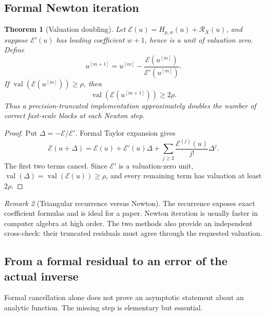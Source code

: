 \documentclass[11pt]{article}
\newtheorem{theorem}{Theorem}[section]
\theoremstyle{definition}
\theoremstyle{remark}
\newtheorem{remark}[theorem]{Remark}
\newcommand{\calE}{\mathcal E}
\DeclareMathOperator{\val}{val}
\begin{document}
\subsection{Formal Newton iteration}

\begin{theorem}[Valuation doubling]\label{thm:newton-doubling}
Let \(\calE(u)=H_{p,w}(u)+\mathscr R_X(u)\), and suppose
\(\calE'(u)\) has leading coefficient \(w+1\), hence is a unit of valuation zero.  Define
\begin{equation}\label{eq:newton-formal}
 u^{[m+1]}=u^{[m]}-\frac{\calE(u^{[m]})}{\calE'(u^{[m]})}.
\end{equation}
If \(\val(\calE(u^{[m]}))\ge\rho\), then
\[
 \val(\calE(u^{[m+1]}))\ge2\rho.
\]
Thus a precision-truncated implementation approximately doubles the number of correct fast-scale blocks at each Newton step.
\end{theorem}

\begin{proof}
Put \(\Delta=-\calE/\calE'\).  Formal Taylor expansion gives
\[
 \calE(u+\Delta)=\calE(u)+\calE'(u)\Delta
 +\sum_{j\ge2}\frac{\calE^{(j)}(u)}{j!}\Delta^j.
\]
The first two terms cancel.  Since \(\calE'\) is a valuation-zero unit,
\(\val(\Delta)=\val(\calE(u))\ge\rho\), and every remaining term has valuation at least \(2\rho\).
\end{proof}

\begin{remark}[Triangular recurrence versus Newton]
The recurrence exposes exact coefficient formulas and is ideal for a paper.  Newton iteration is usually faster in computer algebra at high order.  The two methods also provide an independent cross-check: their truncated residuals must agree through the requested valuation.
\end{remark}

\subsection{From a formal residual to an error of the actual inverse}

Formal cancellation alone does not prove an asymptotic statement about an analytic function.  The missing step is elementary but essential.
\end{document}
